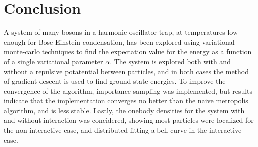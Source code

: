 \section{Conclusion}
A system of many bosons in a harmonic oscillator trap, at temperatures low enough for Bose-Einstein
condensation, has been explored using variational monte-carlo techniques to find the expectation
value for the energy as a function of a single variational parameter $\alpha$. The system is
explored both with and without a repulsive potatential between particles, and in both cases the
method of gradient descent is used to find ground-state energies. To improve the convergence of
the algorithm, importance sampling was implemented, but results indicate that the implementation
converges no better than the naive metropolis algorithm, and is less stable. 
Lastly, the onebody densities for the system with and without interaction was
concidered, showing most particles were localized for the non-interactive case, and distributed
fitting a bell curve in the interactive case.
